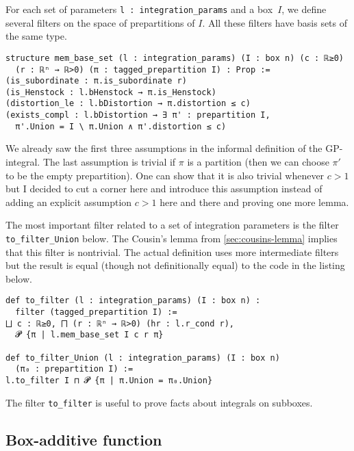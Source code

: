 \documentclass[a4paper, UKenglish,cleveref, autoref, thm-restate]{lipics-v2021}
\begin{document}
For each set of parameters \lstinline=l : integration_params= and a
box~\(I\), we define several filters on the space of prepartitions of
\(I\). All these filters have basis sets of the same type.

\begin{lstlisting}[caption={Basis sets used to define filters related to integration parameters.}]
structure mem_base_set (l : integration_params) (I : box n) (c : ℝ≥0)
  (r : ℝⁿ → ℝ>0) (π : tagged_prepartition I) : Prop :=
(is_subordinate : π.is_subordinate r)
(is_Henstock : l.bHenstock → π.is_Henstock)
(distortion_le : l.bDistortion → π.distortion ≤ c)
(exists_compl : l.bDistortion → ∃ π' : prepartition I,
  π'.Union = I \ π.Union ∧ π'.distortion ≤ c)
\end{lstlisting}

We already saw the first three assumptions in the informal definition
of the GP-integral. The last assumption is trivial if \(\pi\) is a
partition (then we can choose \(\pi'\) to be the empty
prepartition). One can show that it is also trivial whenever \(c>1\)
but I decided to cut a corner here and introduce this assumption
instead of adding an explicit assumption \(c>1\) here and there and
proving one more lemma.

The most important filter related to a set of integration parameters
is the filter \lstinline=to_filter_Union= below. The Cousin's lemma
from \autoref{sec:cousins-lemma} implies that this filter is
nontrivial. The actual definition uses more intermediate filters but
the result is equal (though not definitionally equal) to the code in
the listing below.

\begin{lstlisting}[caption=Filters defined by a set of integration parameters and a box]
def to_filter (l : integration_params) (I : box n) :
  filter (tagged_prepartition I) :=
⨆ c : ℝ≥0, ⨅ (r : ℝⁿ → ℝ>0) (hr : l.r_cond r),
  𝓟 {π | l.mem_base_set I c r π}

def to_filter_Union (l : integration_params) (I : box n)
  (π₀ : prepartition I) :=
l.to_filter I ⊓ 𝓟 {π | π.Union = π₀.Union}
\end{lstlisting}

The filter \lstinline=to_filter= is useful to prove facts about
integrals on subboxes.

\subsection{Box-additive function}%
\label{sec:box-addit-funct}
\end{document}
